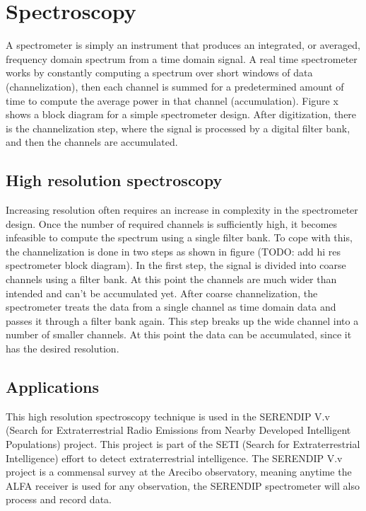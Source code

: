 \section{Spectroscopy}
\label{Real Time Radio Astronomy Algorithms:Spectroscopy}
A spectrometer is simply an instrument that produces an integrated, or averaged, frequency domain spectrum from a time domain signal. 
A real time spectrometer works by constantly computing a spectrum over short windows of data (channelization), then each channel is summed for a predetermined amount of time to compute the average power in that channel (accumulation). 
Figure x shows a block diagram for a simple spectrometer design. 
After digitization, there is the channelization step, where the signal is processed by a digital filter bank, and then the channels are accumulated. 

\subsection{High resolution spectroscopy}
Increasing resolution often requires an increase in complexity in the spectrometer design. 
Once the number of required channels is sufficiently high, it becomes infeasible to compute the spectrum using a single filter bank. 
To cope with this, the channelization is done in two steps as shown in figure (TODO: add hi res spectrometer block diagram). 
In the first step, the signal is divided into coarse channels using a filter bank. 
At this point the channels are much wider than intended and can't be accumulated yet. 
After coarse channelization, the spectrometer treats the data from a single channel as time domain data and passes it through a filter bank again. 
This step breaks up the wide channel into a number of smaller channels. 
At this point the data can be accumulated, since it has the desired resolution.

\subsection{Applications}

This high resolution spectroscopy technique is used in the SERENDIP V.v (Search for Extraterrestrial Radio Emissions from Nearby Developed Intelligent Populations) project. 
This project is part of the SETI (Search for Extraterrestrial Intelligence) effort to detect extraterrestrial intelligence. 
The SERENDIP V.v project is a commensal survey at the Arecibo observatory, meaning anytime the ALFA receiver is used for any observation, the SERENDIP spectrometer will also process and record data. %

